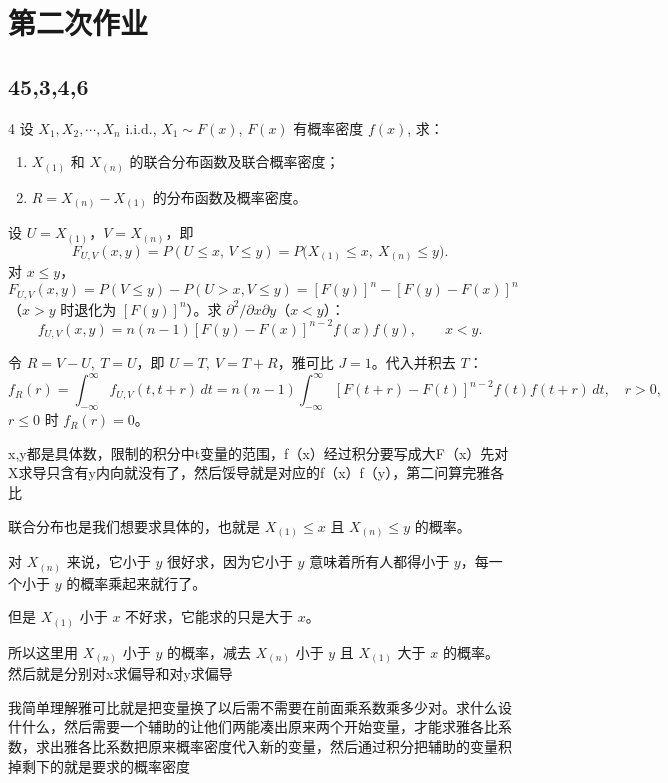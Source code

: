 \section{第二次作业}

\subsection{45,3,4,6}

\begin{homework}{4}
设 $X_1, X_2, \cdots, X_n$ i.i.d., $X_1 \sim F(x)$, $F(x)$ 有概率密度 $f(x)$, 求：
\begin{enumerate}
    \item $X_{(1)}$ 和 $X_{(n)}$ 的联合分布函数及联合概率密度；
    \item $R = X_{(n)} - X_{(1)}$ 的分布函数及概率密度。
\end{enumerate}
\end{homework}
\begin{solution}
设 $U=X_{(1)}$，$V=X_{(n)}$，即
\[
F_{U,V}(x,y)=P(U\le x,\,V\le y)=P\bigl(X_{(1)}\le x,\ X_{(n)}\le y\bigr).
\]
对 $x\le y$，
\[
F_{U,V}(x,y)=P(V\le y)-P(U>x,V\le y)=[F(y)]^n-[F(y)-F(x)]^n
\]
（$x>y$ 时退化为 $[F(y)]^n$）。求 $\partial^2/\partial x\partial y$（$x<y$）：
\[
f_{U,V}(x,y)=n(n-1)[F(y)-F(x)]^{n-2}f(x)f(y),\qquad x<y.
\]

令 $R=V-U,\ T=U$，即 $U=T,\ V=T+R$，雅可比 $J=1$。代入并积去 $T$：
\[
f_R(r)=\int_{-\infty}^{\infty} f_{U,V}(t,t+r)\,dt
=n(n-1)\int_{-\infty}^{\infty}[F(t+r)-F(t)]^{n-2}f(t)f(t+r)\,dt,\quad r>0,
\]
$r\le0$ 时 $f_R(r)=0$。
\end{solution}
\begin{dxtips}
    x,y都是具体数，限制的积分中t变量的范围，f（x）经过积分要写成大F（x）先对X求导只含有y内向就没有了，然后馁导就是对应的f（x）f（y），第二问算完雅各比
\end{dxtips}
\begin{dxtips}
联合分布也是我们想要求具体的，也就是 $X_{(1)}\le x$ 且 $X_{(n)}\le y$ 的概率。

对 $X_{(n)}$ 来说，它小于 $y$ 很好求，因为它小于 $y$ 意味着所有人都得小于 $y$，每一个小于 $y$ 的概率乘起来就行了。

但是 $X_{(1)}$ 小于 $x$ 不好求，它能求的只是大于 $x$。

所以这里用 $X_{(n)}$ 小于 $y$ 的概率，减去 $X_{(n)}$ 小于 $y$ 且 $X_{(1)}$ 大于 $x$ 的概率。然后就是分别对x求偏导和对y求偏导
\end{dxtips}
\begin{dxtips}
    我简单理解雅可比就是把变量换了以后需不需要在前面乘系数乘多少对。求什么设什什么，然后需要一个辅助的让他们两能凑出原来两个开始变量，才能求雅各比系数，求出雅各比系数把原来概率密度代入新的变量，然后通过积分把辅助的变量积掉剩下的就是要求的概率密度
\end{dxtips}
